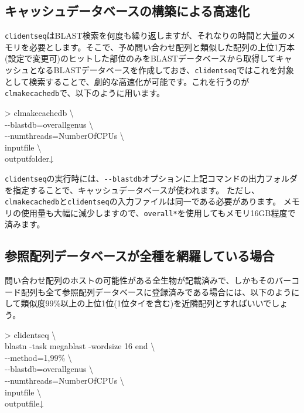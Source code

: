 \documentclass[titlepage,10pt,a4paper,english]{jsbook}
\newenvironment{cmd}{\begin{oframed}\raggedright\ttfamily\footnotesize\setlength{\baselineskip}{1.4em}}{\end{oframed}\vspace{-1em}}
\begin{document}
\subsection{キャッシュデータベースの構築による高速化}

\texttt{clidentseq}はBLAST検索を何度も繰り返しますが、それなりの時間と大量のメモリを必要とします。そこで、予め問い合わせ配列と類似した配列の上位1万本(設定で変更可)のヒットした部位のみをBLASTデータベースから取得してキャッシュとなるBLASTデータベースを作成しておき、\texttt{clidentseq}ではこれを対象として検索することで、劇的な高速化が可能です。これを行うのが\texttt{clmakecachedb}で、以下のように用います。

\begin{cmd}
{\textgreater} clmakecachedb {\textbackslash}\\
{-}{-}blastdb=overall{\textunderscore}genus {\textbackslash}\\
{-}{-}numthreads=NumberOfCPUs {\textbackslash}\\
inputfile {\textbackslash}\\
outputfolder↓
\end{cmd}

\texttt{clidentseq}の実行時には、\texttt{{-}{-}blastdb}オプションに上記コマンドの出力フォルダを指定することで、キャッシュデータベースが使われます。
ただし、\texttt{clmakecachedb}と\texttt{clidentseq}の入力ファイルは同一である必要があります。
メモリの使用量も大幅に減少しますので、\texttt{overall{\textunderscore}*}を使用してもメモリ16GB程度で済みます。

\subsection{参照配列データベースが全種を網羅している場合}\label{subsection:completereferencedatabase}

問い合わせ配列のホストの可能性がある全生物が記載済みで、しかもそのバーコード配列も全て参照配列データベースに登録済みである場合には、以下のようにして類似度99\%以上の上位1位(1位タイを含む)を近隣配列とすればいいでしょう。
\begin{cmd}
{\textgreater} clidentseq {\textbackslash}\\
blastn -task megablast -word{\textunderscore}size 16 end {\textbackslash}\\
{-}{-}method=1,99\% {\textbackslash}\\
{-}{-}blastdb=overall{\textunderscore}genus {\textbackslash}\\
{-}{-}numthreads=NumberOfCPUs {\textbackslash}\\
inputfile {\textbackslash}\\
outputfile↓
\end{cmd}
\end{document}
